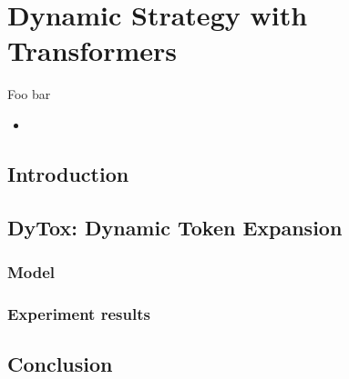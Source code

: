 \chapter{Dynamic Strategy with Transformers}
\label{chapter:dynamic}

\begin{chapabstract}
    Foo bar


    \begin{itemize}
        \item {}
    \end{itemize}

\end{chapabstract}
\newpage

\minitoc
{}


\section{Introduction}

\section{DyTox: Dynamic Token Expansion}

\subsection{Model}

\subsection{Experiment results}


\section{Conclusion}

